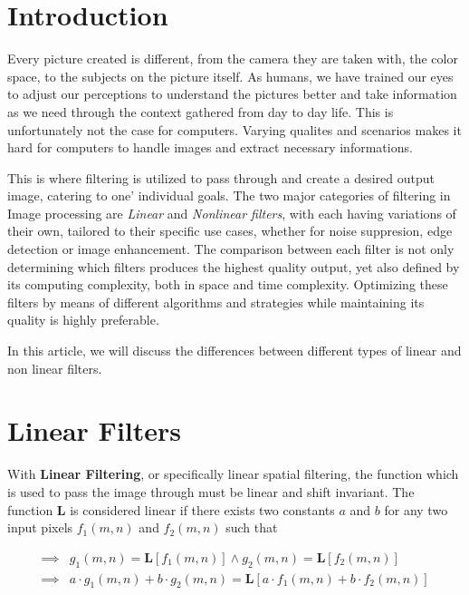 \documentclass[twoside,a4paper,article]{combine}
\begin{document}


\begin{abstract}
\end{abstract}

\tableofcontents
\newpage

\section{Introduction}
Every picture created is different, from the camera they are taken with, the color space, to the subjects on the picture itself. As humans, we have trained our eyes to adjust our perceptions to
understand the pictures better and take information as we need through the context gathered from day to day life. This is unfortunately not the case for computers. Varying qualites and scenarios makes it
hard for computers to handle images and extract necessary informations.

This is where filtering is utilized to pass through and create a desired output image, catering to one' individual goals. The two major categories of filtering in Image processing are \emph{Linear} and \emph{Nonlinear filters}, with each
having variations of their own, tailored to their specific use cases, whether for noise suppresion, edge detection or image enhancement\cite{MISRA2020289}. The comparison between each filter is not only determining which filters produces the highest quality output, yet
also defined by its computing complexity, both in space and time complexity. Optimizing these filters by means of different algorithms and strategies while maintaining its quality is highly preferable.

In this article, we will discuss the differences between different types of linear and non linear filters.\footnotemark{}
\section{Linear Filters}
With \textbf{Linear Filtering}, or specifically linear spatial filtering, the function which is used to pass the image through
must be linear and shift invariant. The function $\pmb{L}$ is considered linear if there exists two constants $a$ and $b$ for any
two input pixels $f_1(m, n)$ and $f_2(m, n)$ such that

\begin{align*}
    \implies & g_1(m, n) = \boldsymbol{L} [f_1(m, n)] \land g_2(m, n) = \boldsymbol{L} [f_2(m, n)] \\
    \implies & a \cdot g_1(m, n) + b \cdot g_2(m, n) = \boldsymbol{L} [a \cdot f_1(m, n) + b \cdot f_2(m, n)]
\end{align*}
\end{document}
